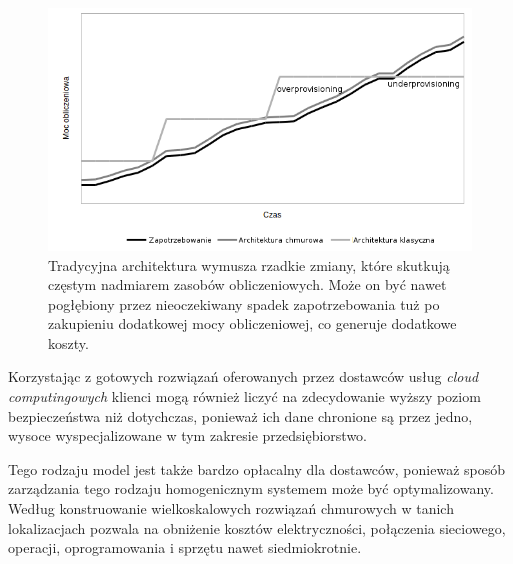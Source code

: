 \documentclass[12pt,a4paper,twoside]{article}
\begin{document}
\begin{figure}[h]
  \centering
\includegraphics[scale=0.8]{../obrazy/fig:overp.png}
\caption{Tradycyjna architektura wymusza rzadkie zmiany, które skutkują częstym nadmiarem zasobów obliczeniowych. Może on być nawet pogłębiony przez nieoczekiwany spadek zapotrzebowania tuż po zakupieniu dodatkowej mocy obliczeniowej, co generuje dodatkowe koszty. \label{fig:overp}}
\end{figure}

Korzystając z gotowych rozwiązań oferowanych przez dostawców usług \textit{cloud computingowych} klienci mogą również liczyć na zdecydowanie wyższy poziom bezpieczeństwa niż dotychczas, ponieważ ich dane chronione są przez jedno, wysoce wyspecjalizowane w tym zakresie przedsiębiorstwo.

Tego rodzaju model jest także bardzo opłacalny dla dostawców, ponieważ sposób zarządzania tego rodzaju homogenicznym systemem może być optymalizowany. Według \citet{baun2011} konstruowanie wielkoskalowych rozwiązań chmurowych w tanich lokalizacjach pozwala na obniżenie kosztów elektryczności, połączenia sieciowego, operacji, oprogramowania i sprzętu nawet siedmiokrotnie.
\end{document}
